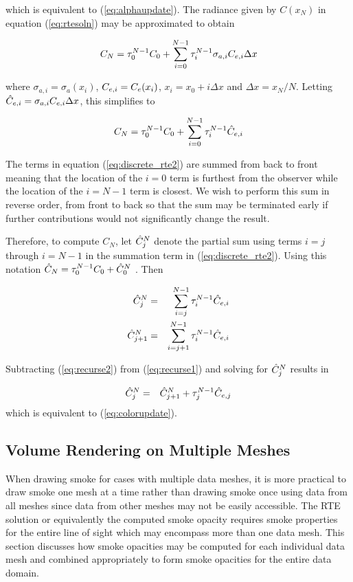 which is equivalent to (\ref{eq:alphaupdate}).  The radiance given by $C(x_N)$ in equation (\ref{eq:rtesoln}) may be approximated to obtain

\begin{equation}
\label{eq:discrete_rte}
C_{N} = \tau_{0}^{N-1}C_0 +
\sum_{i=0}^{N-1}\tau_{i}^{N-1}\sigma_{a,i}C_{e,i}\Delta x
\end{equation}

where $\sigma_{a,i}=\sigma_a(x_i)$, $C_{e,i}=C_e(x_i)$, $x_i=x_0+i\Delta x$ and $\Delta x=x_N/N$.
Letting $\hat{C}_{e,i}=\sigma_{a,i}C_{e,i}\Delta x$, this simplifies to

\begin{equation}
\label{eq:discrete_rte2}
C_N = \tau_{0}^{N-1}C_0 + \sum_{i=0}^{N-1}\tau_{i}^{N-1}\hat{C}_{e,i}
\end{equation}

The terms in equation (\ref{eq:discrete_rte2}) are summed from back to front meaning that the location of the $i=0$ term is furthest from the observer while the location of the $i=N-1$ term is closest.  We wish to perform this sum in reverse order, from front to back so that the sum may be terminated early if further contributions would not significantly change the result.

Therefore, to compute $C_N$, let $\hat{C}_{j}^N$ denote the partial sum using terms $i=j$ through $i=N-1$ in the summation term in (\ref{eq:discrete_rte2}).  Using this notation $\hat{C}_N=\tau_{0}^{N-1}C_0+\hat{C}_{0}^N$ . Then

\begin{eqnarray}
\label{eq:recurse1}
\hat{C}_{j}^N &= &\sum_{i=j}^{N-1}\tau_{i}^{N-1}\hat{C}_{e,i}\\
\label{eq:recurse2}
\hat{C}_{j+1}^N     &= &\sum_{i=j+1}^{N-1}  \tau_{i}^{N-1}\hat{C}_{e,i}
\end{eqnarray}

Subtracting (\ref{eq:recurse2}) from (\ref{eq:recurse1}) and solving for $\hat{C}_{j}^N$ results in

\begin{eqnarray*}
\hat{C}_{j}^N&=&\hat{C}_{j+1}^N+\tau_{j}^{N-1}\hat{C}_{e,j}
\end{eqnarray*}
which is equivalent to (\ref{eq:colorupdate}).

%
%

\subsection{Volume Rendering on Multiple Meshes}
When drawing smoke for cases with multiple data meshes, it is more practical to draw smoke one mesh at a time rather than drawing smoke once using data from all meshes since data from other meshes may not be easily accessible.  The RTE solution or equivalently the computed smoke opacity requires smoke properties for the entire line of sight which may encompass more than one data mesh.  This section discusses how smoke opacities may be computed for each individual data mesh and combined appropriately to form smoke opacities for the entire data domain.

